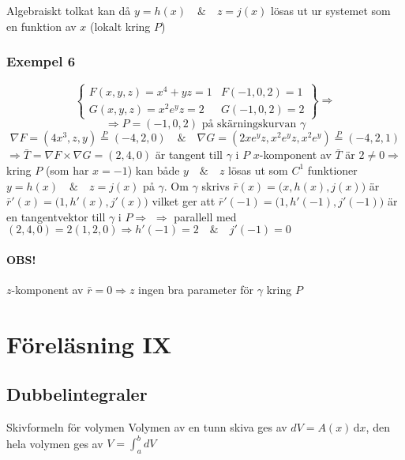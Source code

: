 \documentclass[a4paper]{article}
\begin{document}
Algebraiskt tolkat kan då \(y = h(x) \quad\&\quad z = j(x)\) lösas ut ur systemet som en funktion av \(x\) (lokalt kring \(P\))

\subsubsection{Exempel 6}
\begin{equation}\label{eq:8.8}
	\begin{Bmatrix}
		F(x,y,z) = x^4 + yz = 1 & F(-1,0,2) = 1 \\
		G(x,y,z) = x^2e^yz = 2 & G(-1,0,2) = 2
	\end{Bmatrix} \Rightarrow
\end{equation}
\[\Rightarrow P = (-1,0,2) \text{ på skärningskurvan } \gamma\]
\[\nabla F = (4x^3,z,y) \overset{P}{=} (-4,2,0) \quad\&\quad \nabla G = (2xe^yz,x^2e^yz,x^2e^y) \overset{P}{=} (-4,2,1)\]
\(\Rightarrow \bar{T} = \nabla F \times \nabla G = (2,4,0)\) är tangent till \(\gamma\) i \(P\) \newline
\(x\)-komponent av \(\bar{T}\) är \(2 \neq 0 \Rightarrow\) kring \(P\) (som har \(x = -1\)) kan både \(y \quad\&\quad z\) lösas ut som \(C^1\) funktioner \(y = h(x) \quad\&\quad z = j(x)\) på \(\gamma\). \newline
Om \(\gamma\) skrivs \(\bar{r}(x) = \Big(x,h(x),j(x)\Big)\) är \(\bar{r}'(x) = \Big(1,h'(x),j'(x)\Big)\) vilket ger att \(\bar{r}'(-1) = \Big(1,h'(-1),j'(-1)\Big)\) är en tangentvektor till \(\gamma\) i \(P \Rightarrow\) \newline
\(\Rightarrow\) parallell med \((2,4,0) = 2(1,2,0) \Rightarrow h'(-1) = 2 \quad\&\quad j'(-1) = 0\) \newline
\paragraph{OBS!} \(z\)-komponent av \(\bar{r} = 0 \Rightarrow z\) ingen bra parameter för \(\gamma\) kring \(P\)







\section{Föreläsning IX}
\subsection{Dubbelintegraler}
Skivformeln för volymen \newline
Volymen av en tunn skiva ges av $dV = A(x)\,\mathrm{d}x$, den hela volymen ges av $V = \int_a^b dV$
\end{document}
